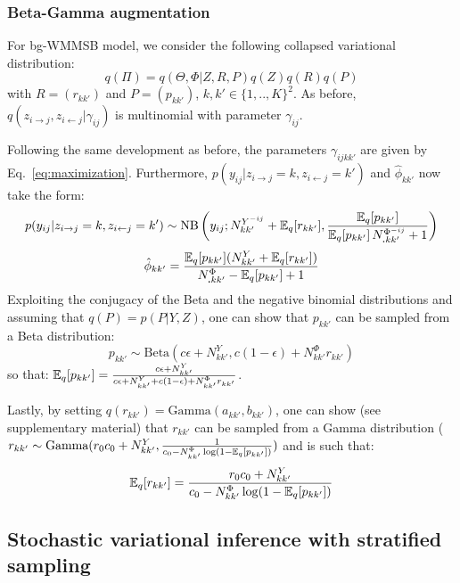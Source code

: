 \subsubsection{Beta-Gamma augmentation}

For bg-WMMSB model, we consider the following collapsed variational distribution:
%
\begin{equation*}
q(\Pi) = q(\Theta, \Phi|Z, R, P)q(Z)q(R)q(P)
\end{equation*}
%
with $R=(r_{kk'})$ and $P=(p_{kk'})$, $k,k' \in \{1,..,K\}^2$. As before, $q(z_{i \rightarrow j}, z_{i \leftarrow j}|\gamma_{ij})$ is multinomial with parameter $\gamma_{ij}$. 

Following the same development as before, the parameters $\gamma_{ijkk'}$ are given by Eq.~\ref{eq:maximization}. Furthermore, $p(y_{ij}|z_{i \rightarrow j}=k,z_{i \leftarrow j}=k')$ and $\hat \phi_{kk'}$ now take the form:
%
\[
p(y_{ij} | z_{i \rightarrow j} = k,z_{i \leftarrow j} = k')  \sim \mathrm{NB}\left(y_{ij}; N^{Y^{-ij}}_{kk'} + \mathbb{E}_{q}[r_{kk'}], \frac{\mathbb{E}_{q}[p_{kk'}]}{\mathbb{E}_{q}[p_{kk'}]\,N^{\Phi^{-ij}}_{\bm{.}kk'} + 1} \right)
\]
\[
\hat \phi_{kk'} = \frac{\mathbb{E}_{q}[p_{kk'}](N^Y_{kk'} + \mathbb{E}_{q}[r_{kk'}])}{N^{\Phi}_{\bm{.}kk'} - \mathbb{E}_{q}[p_{kk'}] + 1}
\]
%
Exploiting the conjugacy of the Beta and the negative binomial distributions and assuming that $q(P)=p(P|Y,Z)$, one can show that $p_{kk'}$ can be sampled from a Beta distribution:
%
\begin{equation} \label{eq:pk_update}
p_{kk'} \sim \textrm{Beta}(c\epsilon + N^Y_{kk'}, c(1-\epsilon) + N^\Phi_{kk'}r_{kk'})
\end{equation}
%
so that: $\mathbb{E}_{q}[p_{kk'}] = \frac{c\epsilon + N^Y_{kk'}}{c\epsilon + N^Y_{kk'} + c(1-\epsilon) + N^\Phi_{kk'}r_{kk'}}$.

Lastly, by setting $q(r_{kk'}) = \textrm{Gamma}(a_{kk'},b_{kk'})$, one can show (see supplementary material) that $r_{kk'}$ can be sampled from a Gamma distribution ($r_{kk'} \sim \textrm{Gamma}(r_0c_0+N^Y_{kk'},\frac{1}{c_0  -N^\Phi_{kk'}\log(1-\mathbb{E}_{q}[p_{kk'}])})$ and is such that:
%
\begin{equation}
\mathbb{E}_{q}[r_{kk'}] = \frac{r_0c_0+N^Y_{kk'}}{c_0  -N^\Phi_{kk'}\log(1-\mathbb{E}_{q}[p_{kk'}])}
\end{equation}

\subsection{Stochastic variational inference with stratified sampling}

